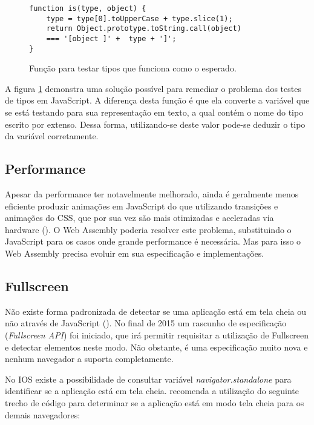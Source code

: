 \begin{figure}[H]
\centering
\begin{verbatim}
function is(type, object) {
    type = type[0].toUpperCase + type.slice(1);
    return Object.prototype.toString.call(object)
    === '[object ]' +  type + ']';
}
\end{verbatim}
\caption{Função para testar tipos que funciona como o esperado.}
\label{fig:fixJSTypes}
\end{figure}

A figura \ref{fig:fixJSTypes} demonstra uma solução possível para
remediar o problema dos testes de tipos em JavaScript. A diferença
desta função é que ela converte a variável que se está testando
para sua representação em texto, a qual contém o nome do tipo escrito
por extenso. Dessa forma, utilizando-se deste valor pode-se deduzir o
tipo da variável corretamente.

\subsection{Performance}

Apesar da performance ter notavelmente melhorado, ainda é geralmente
menos eficiente produzir animações em JavaScript do que utilizando
transições e animações do CSS, que por sua vez são mais
otimizadas e aceleradas via hardware \autocite{html5mostwanted}
(). O Web Assembly poderia resolver este problema,
substituindo o JavaScript para os casos onde grande performance é
necessária. Mas para isso o Web Assembly precisa evoluir em sua
especificação e implementações.

\subsection{Fullscreen}

Não existe forma padronizada de detectar se uma aplicação
está em tela cheia ou não através de JavaScript
(). No final de 2015 um rascunho de 
especificação (\textit{Fullscreen API}) foi iniciado, que irá permitir 
requisitar a utilização de Fullscreen e detectar elementos neste modo.
Não obstante, é uma especificação muito nova e nenhum navegador a suporta
completamente.

No IOS existe a possibilidade de consultar variável
\textit{navigator.standalone} para identificar se a aplicação está
em tela cheia. \citet{homescreenwebapps} recomenda a utilização do
seguinte trecho de código para determinar se a aplicação está em
modo tela cheia para os demais navegadores:

